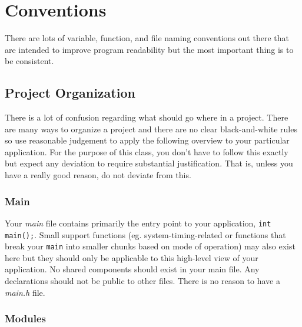 \documentclass[10pt]{article}
\begin{document}
\section{Conventions}

There are lots of variable, function, and file naming conventions out there that are intended to improve program readability but the most important thing is to be consistent.

\subsection{Project Organization}

There is a lot of confusion regarding what should go where in a project. There are many ways to organize a project and there are no clear black-and-white rules so use reasonable judgement to apply the following overview to your particular application. For the purpose of this class, you don't have to follow this exactly but expect any deviation to require substantial justification. That is, unless you have a really good reason, do not deviate from this. \\

\subsubsection{Main}

Your \textit{main} file contains primarily the entry point to your application, \texttt{int main();}. Small support functions (eg. system-timing-related or functions that break your \texttt{main} into smaller chunks based on mode of operation) may also exist here but they should only be applicable to this high-level view of your application. No shared components should exist in your main file. Any declarations should not be public to other files. There is no reason to have a \textit{main.h} file. \\

\subsubsection{Modules}
\end{document}
